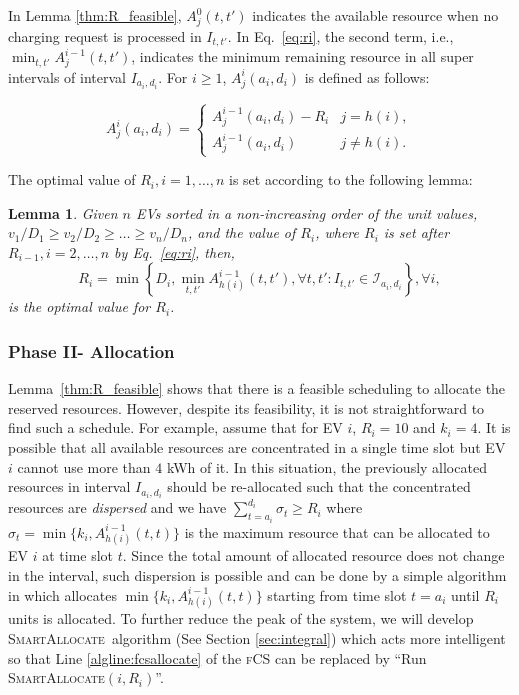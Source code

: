 \documentclass[journal]{IEEEtran}
\newcommand{\revv}[1]{{\color{black}#1}}%
\newcommand{\sa}{\textsc{SmartAllocate}}
\newcommand{\fcs}{\textsc{fCS}\xspace}
\newtheorem{lem}{Lemma}
\begin{document}
{In Lemma \ref{thm:R_feasible}, $A^0_j(t,t')$ indicates the available resource when no charging request is processed in $I_{t,t'}$. 
In Eq.~\eqref{eq:ri}, the second term, i.e., $\min_{t,t'} A^{i-1}_{j}(t,t')$, indicates the minimum remaining resource in all super intervals of interval $I_{a_i,d_i}$. For $i\geq 1$, $A^i_j(a_i,d_i)$ is defined as follows:

\begin{equation*}
A^i_j(a_i,d_i)=\begin{cases}
A^{i-1}_j(a_i,d_i)-R_i & j=h(i),\\
A^{i-1}_j(a_i,d_i) & j\neq h(i).
\end{cases} 
\end{equation*}

The optimal value of $R_i, i=1,\dots ,n$ is set according to the following lemma:

\begin{lem}
	Given $n$ EVs sorted in a non-increasing order of the unit values, ${v_1\slash D_1\geq v_2\slash D_2\geq\dots \geq v_n\slash D_n}$, and the value of $R_i$, where $R_i$ is set after $R_{i-1}, i=2,\dots ,n$ by Eq.~\eqref{eq:ri}, then, 
	$$R_i = \min\left\{D_i, \min_{t,t'} A^{i-1}_{h(i)}(t,t'), \forall t,t':I_{t,t'}\in\mathcal{I}_{a_i,d_i}\right\},\forall i,$$
	is the optimal value for $R_i$. 
	\label{thm:R_star}
\end{lem}

\subsubsection{Phase II- Allocation\label{sec:ph2}} Lemma~\ref{thm:R_feasible} shows that there is a feasible scheduling to allocate the reserved resources.
However, despite its feasibility, it is not straightforward to find such \revv{a schedule}. For example, assume that for EV $i$, $R_i=10$ and $k_i=4$. It is possible that all available resources are concentrated in a single time slot but EV $i$ cannot use more than $4$ kWh of it. In this situation, the previously allocated resources in interval $I_{a_i,d_i}$ should be re-allocated such that the concentrated resources are \emph{dispersed} and we have $\sum_{t=a_i}^{d_i}\sigma_t \geq R_i$ where $\sigma_t =\min\{k_i,A^{i-1}_{h(i)}(t,t)\}$ is the maximum resource that can be allocated to EV $i$ at time slot $t$. Since the total amount of allocated resource does not change in the interval, such dispersion is possible and can be done by a simple algorithm in which allocates $\min\{k_i,A^{i-1}_{h(i)}(t,t)\}$ starting from time slot $t=a_i$ until $R_i$ units is allocated. To further reduce the peak of the system, we will develop \sa\ algorithm (See Section \ref{sec:integral}) which acts more intelligent so that Line \ref{algline:fcsallocate} of the \fcs can be replaced by ``Run \sa$(i,R_i)$''.



}
\end{document}
